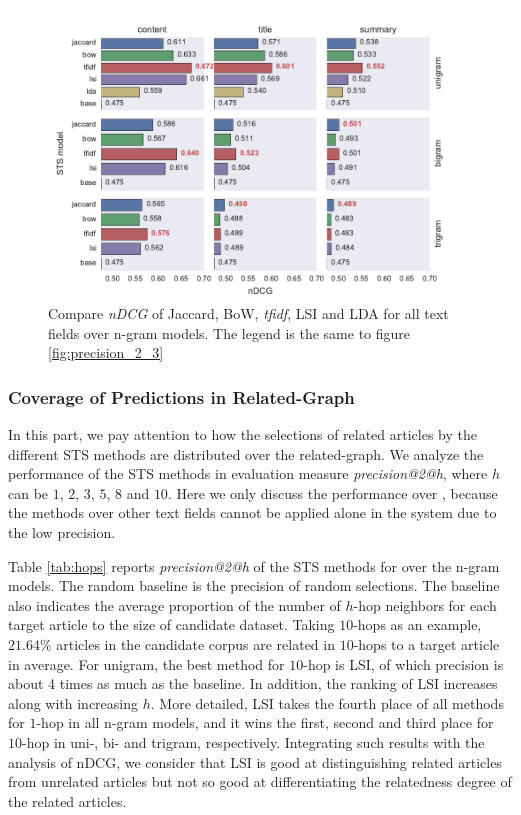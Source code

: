 \begin{figure}[!htb]
    \centering
    \includegraphics[width=\textwidth]{fig/ndcg}
    \caption[Compare \textit{nDCG} of Jaccard, BoW, \textit{tfidf}, LSI and LDA for all text fields over n-gram models]{Compare \textit{nDCG} of Jaccard, BoW, \textit{tfidf}, LSI and LDA for all text fields over n-gram models. The legend is the same to figure \ref{fig:precision_2_3}}
    \label{fig:ndcg}
\end{figure}

\subsubsection{Coverage of Predictions in Related-Graph}

In this part, we pay attention to how the selections of related articles by the different STS methods are distributed over the related-graph. We analyze the performance of the STS methods in evaluation measure \textit{precision@2@h}, where $h$ can be $1$, $2$, $3$, $5$, $8$ and $10$. Here we only discuss the performance over \icontent{}, because the methods over other text fields cannot be applied alone in the system due to the low precision. 

Table \ref{tab:hops} reports \textit{precision@2@h} of the STS methods for \icontent{} over the n-gram models. The random baseline is the precision of random selections. The baseline also indicates the average proportion of the number of $h$-hop neighbors for each target article to the size of candidate dataset. Taking $10$-hops as an example, $21.64\%$ articles in the candidate corpus are related in $10$-hops to a target article in average. For unigram, the best method for $10$-hop is LSI, of which precision is about 4 times as much as the baseline. In addition, the ranking of LSI increases along with increasing $h$. More detailed, LSI takes the fourth place of all methods for $1$-hop in all n-gram models, and it wins the first, second and third place for $10$-hop in uni-, bi- and trigram, respectively. Integrating such results with the analysis of nDCG, we consider that LSI is good at distinguishing related articles from unrelated articles but not so good at differentiating the relatedness degree of the related articles. 

